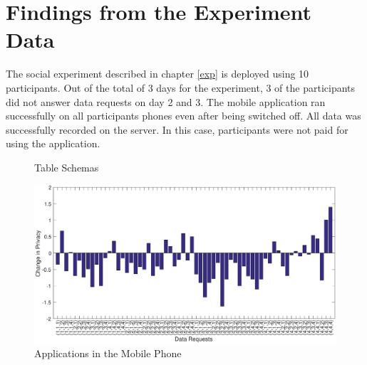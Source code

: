 \section{Findings from the Experiment Data}

The social experiment described in chapter \ref{exp} is deployed using 10 participants. Out of the total of 3 days for the experiment, 3 of the participants did not answer data requests on day 2 and 3. The mobile application ran successfully on all participants phones even after being switched off. All data was successfully recorded on the server. In this case, participants were not paid for using the application.

\begin{figure}[htp]
\hspace{1em}
\caption{Table Schemas}
\label{fig:st3}
\end{figure}

\begin{figure}[ht!]
\centering
\includegraphics[width=\textwidth,keepaspectratio]{./images/day2_day1_privacy}
\caption{Applications in the Mobile Phone}
\label{fig:pre_q6}
\end{figure}

